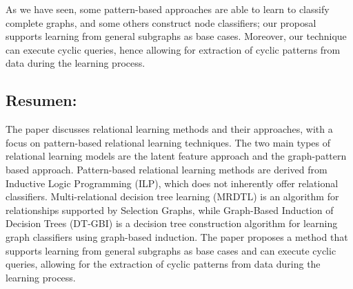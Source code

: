 \documentclass{article}%
\begin{document}
As we have seen, some pattern-based approaches are able to learn to classify complete graphs, and some others construct node classifiers; our proposal supports learning from general subgraphs as base cases. Moreover, our technique can execute cyclic queries, hence allowing for extraction of cyclic patterns from data during the learning process.%
\subsection{Resumen:}%
\label{subsec:Resumen}%
The paper discusses relational learning methods and their approaches, with a focus on pattern-based relational learning techniques. The two main types of relational learning models are the latent feature approach and the graph-pattern based approach. Pattern-based relational learning methods are derived from Inductive Logic Programming (ILP), which does not inherently offer relational classifiers. Multi-relational decision tree learning (MRDTL) is an algorithm for relationships supported by Selection Graphs, while Graph-Based Induction of Decision Trees (DT-GBI) is a decision tree construction algorithm for learning graph classifiers using graph-based induction. The paper proposes a method that supports learning from general subgraphs as base cases and can execute cyclic queries, allowing for the extraction of cyclic patterns from data during the learning process.

%
\end{document}

